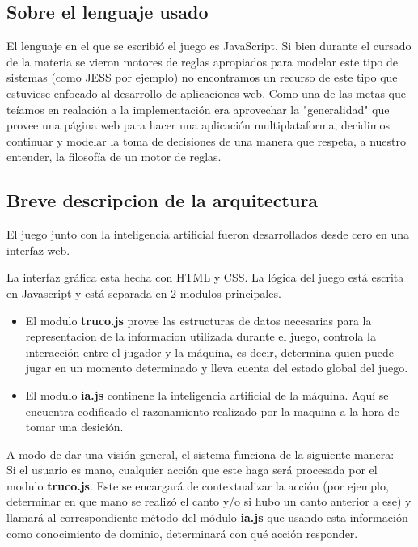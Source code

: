 \documentclass[12pt,a4paper]{article}
\begin{document}
\subsection{Sobre el lenguaje usado}
El lenguaje en el que se escribi\'o el juego es JavaScript. Si bien durante el cursado de la materia se vieron motores de reglas 
apropiados para modelar este tipo de sistemas (como JESS por ejemplo) no encontramos un recurso de este tipo que estuviese enfocado
al desarrollo de aplicaciones web. Como una de las metas que te\'iamos en realaci\'on a la implementaci\'on era aprovechar la "generalidad" que
provee una p\'agina web para hacer una aplicaci\'on multiplataforma, decidimos continuar y modelar la toma de decisiones de 
una manera que respeta, a nuestro entender, la filosof\'ia de un motor de reglas.

\subsection{Breve descripcion de la arquitectura}
El juego junto con la inteligencia artificial fueron desarrollados desde cero en una interfaz web. 

La interfaz gr\'afica esta hecha con HTML y CSS. La l\'ogica del juego est\'a escrita en Javascript y est\'a separada en 2 modulos principales.  
\begin{itemize}
\item El modulo \textbf{truco.js} provee las estructuras de datos necesarias para la representacion de la informacion utilizada durante el juego,
controla la interacci\'on entre el jugador y la m\'aquina, es decir, determina quien puede jugar en un momento determinado y lleva cuenta del
estado global del juego.

\item El modulo \textbf{ia.js} continene la inteligencia artificial de la m\'aquina. Aqu\'i se encuentra codificado el razonamiento realizado por la maquina
a la hora de tomar una desici\'on.

\end{itemize}

A modo de dar una visi\'on general, el sistema funciona de la siguiente manera: \\
Si el usuario es mano, cualquier acci\'on que este haga ser\'a procesada por el modulo \textbf{truco.js}. Este se encargar\'a de contextualizar la
acci\'on (por ejemplo, determinar en que mano se realiz\'o el canto y/o si hubo un canto anterior a ese) y llamar\'a al correspondiente m\'etodo del
m\'odulo \textbf{ia.js} que usando esta informaci\'on como conocimiento de dominio, determinar\'a con qu\'e acci\'on responder.
\end{document}
